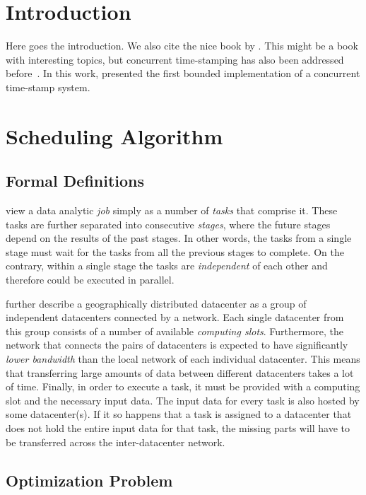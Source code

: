 
\section{Introduction}

Here goes the introduction. We also cite the nice book by \citet{Pinedo:2012}.
This might be a book with interesting topics, but concurrent time-stamping has also been addressed before~\cite{Dolev97}.
In this work, \citet{Dolev97} presented the first bounded implementation of a concurrent time-stamp system.

\section{Scheduling Algorithm}

\subsection{Formal Definitions}

\citet*{Chen2017} view a data analytic \emph{job} simply as a number of \emph{tasks} that comprise it. These tasks are further separated into consecutive \emph{stages}, where the future stages depend on the results of the past stages. In other words, the tasks from a single stage must wait for the tasks from all the previous stages to complete. On the contrary, within a single stage the tasks are \emph{independent} of each other and therefore could be executed in parallel.

\citet{Chen2017} further describe a geographically distributed datacenter as a group of independent datacenters connected by a network. Each single datacenter from this group consists of a number of available \emph{computing slots}. Furthermore, the network that connects the pairs of datacenters is expected to have significantly \emph{lower bandwidth} than the local network of each individual datacenter. This means that transferring large amounts of data between different datacenters takes a lot of time. Finally, in order to execute a task, it must be provided with a computing slot and the necessary input data. The input data for every task is also hosted by some datacenter(s). If it so happens that a task is assigned to a datacenter that does not hold the entire input data for that task, the missing parts will have to be transferred across the inter-datacenter network.

\subsection{Optimization Problem}
